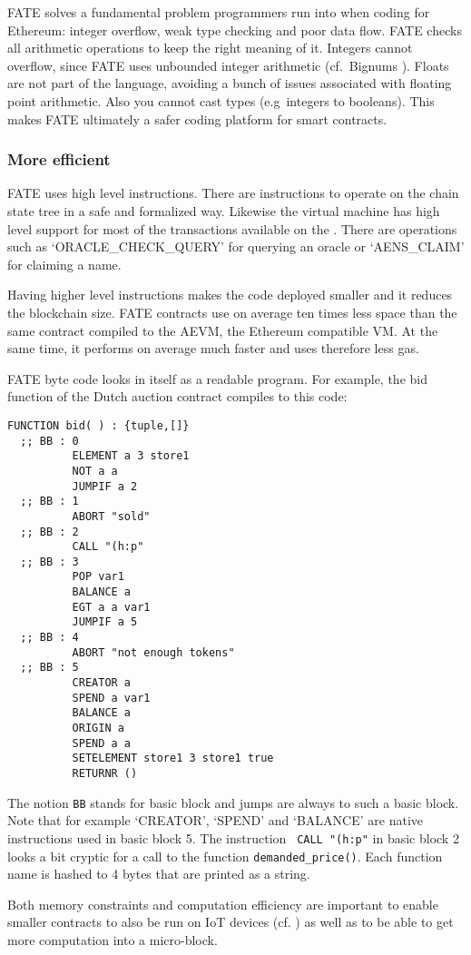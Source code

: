 FATE solves a fundamental problem programmers run into when coding for
Ethereum: integer overflow, weak type checking and poor data
flow. FATE checks all arithmetic operations to keep the right meaning
of it. Integers cannot overflow, since FATE uses unbounded integer
arithmetic (cf.\ Bignums \cite{serpette1989bignum}). Floats are not
part of the language, avoiding a bunch of issues associated with
floating point arithmetic. Also you cannot cast types (e.g\ integers to booleans). This makes
FATE ultimately a safer coding platform for smart contracts.

\subsubsection{More efficient}

FATE uses high level instructions. There are instructions to operate
on the chain state tree in a safe and formalized way. Likewise the
virtual machine has high level support for most of the transactions
available on the \blockchain. There are operations such as
`ORACLE\_CHECK\_QUERY' for querying an oracle or `AENS\_CLAIM' for
claiming a name.

Having higher level instructions makes the code
deployed smaller and it reduces the blockchain size. FATE contracts
use on average ten times less space than the same contract compiled to
the AEVM, the Ethereum compatible VM. At the same time, it performs on
average much faster and uses therefore less gas.

FATE byte code looks in itself as a readable program. For example,
the bid function of the Dutch auction contract compiles to
this code:

\begin{verbatim}
FUNCTION bid( ) : {tuple,[]}
  ;; BB : 0
          ELEMENT a 3 store1
          NOT a a
          JUMPIF a 2
  ;; BB : 1
          ABORT "sold"
  ;; BB : 2
          CALL "(h:p"
  ;; BB : 3
          POP var1
          BALANCE a
          EGT a a var1
          JUMPIF a 5
  ;; BB : 4
          ABORT "not enough tokens"
  ;; BB : 5
          CREATOR a
          SPEND a var1
          BALANCE a
          ORIGIN a
          SPEND a a
          SETELEMENT store1 3 store1 true
          RETURNR ()
\end{verbatim}

The notion \verb+BB+ stands for basic block and jumps are always to
such a basic block. Note that for example `CREATOR', `SPEND' and
`BALANCE' are native instructions used in basic block 5. The
instruction \verb+ CALL "(h:p"+ in basic block 2 looks a bit cryptic for a call to  the
function \verb+demanded_price()+. Each function name is hashed to 4
bytes that are printed as a string.

Both memory constraints and computation efficiency are important to
enable smaller contracts to also be run on IoT devices
(cf. \cite{ellul2018alkylvm}) as well as to be able to get more
computation into a micro-block.
